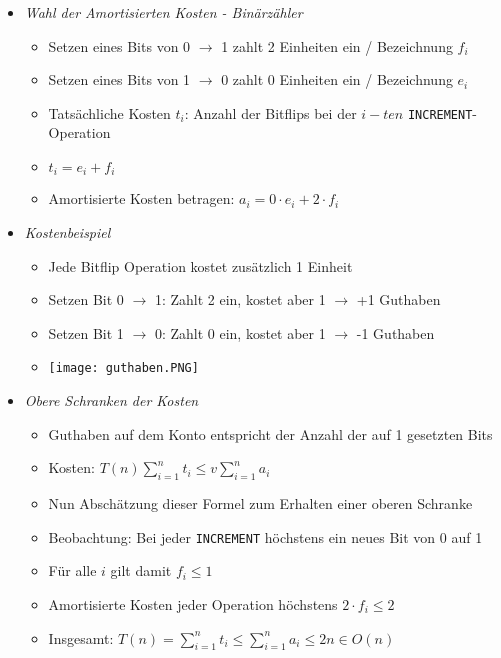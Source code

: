 \begin{itemize}
\begin{itemize}
                \item \textit{Wahl der Amortisierten Kosten - Binärzähler}
                    \begin{itemize}
                        \item Setzen eines Bits von 0 $\rightarrow$ 1 zahlt 2 Einheiten ein / Bezeichnung $f_i$
                        \item Setzen eines Bits von 1 $\rightarrow$ 0 zahlt 0 Einheiten ein / Bezeichnung $e_i$
                        \item Tatsächliche Kosten $t_i$: Anzahl der Bitflips bei der $i-ten$ \texttt{INCREMENT}-Operation
                        \item[] $t_i = e_i + f_i$
                        \item Amortisierte Kosten betragen: $a_i = 0 \cdot e_i + 2 \cdot f_i$ 
                    \end{itemize}

                \item \textit{Kostenbeispiel}
                    \begin{itemize}
                        \item Jede Bitflip Operation kostet zusätzlich 1 Einheit
                        \item Setzen Bit 0 $\rightarrow$ 1: Zahlt 2 ein, kostet aber 1 $\rightarrow$ +1 Guthaben
                        \item Setzen Bit 1 $\rightarrow$ 0: Zahlt 0 ein, kostet aber 1 $\rightarrow$ -1 Guthaben
                        \item[] \texttt{[image: guthaben.PNG]}
                    \end{itemize}
                
                \item \textit{Obere Schranken der Kosten}
                    \begin{itemize}
                        \item Guthaben auf dem Konto entspricht der Anzahl der auf 1 gesetzten Bits
                        \item Kosten: $T(n) \sum^n_{i=1} t_i \leq v\sum^n_{i=1} a_i$
                        \item Nun Abschätzung dieser Formel zum Erhalten einer oberen Schranke
                        \item Beobachtung: Bei jeder \texttt{INCREMENT} höchstens ein neues Bit von 0 auf 1
                        \item Für alle $i$ gilt damit $f_i \leq 1$
                        \item Amortisierte Kosten jeder Operation höchstens $2 \cdot f_i \leq 2$
                        \item Insgesamt: $T(n) = \sum^n_{i=1} t_i \leq \sum^n_{i=1} a_i \leq 2n \in O(n)$
                    \end{itemize}
            \end{itemize}


\end{itemize}
